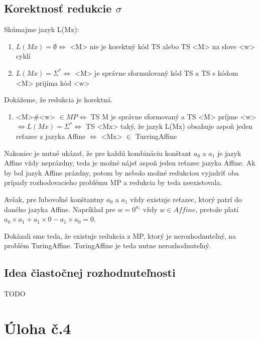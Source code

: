 \documentclass[10pt]{article}
\begin{document}
\subsection*{Korektnosť redukcie $\sigma$}
Skúmajme jazyk L(Mx):
\begin{enumerate}
    \item $L(Mx) = \emptyset \iff$ <M> nie je korektný kód TS alebo TS <M> na slove <w> cyklí 
    \item $L(Mx) = \Sigma^* \iff$ <M> je správne sformulovaný kód TS a TS s kódom <M> prijíma kód <w>
\end{enumerate}

Dokážeme, že redukcia je korektná.
\begin{enumerate}
    \item <M>\#<w> $\in MP \iff$ TS M je správne sformovaný a TS <M> príjme <w> $\iff L(Mx) =
        \Sigma^* \iff$ TS <Mx> taký, že jazyk L(Mx) obsahuje aspoň jeden reťazec z jazyka Affine
        $\iff$ <Mx> $\in$ TurringAffine
\end{enumerate}

Nakoniec je nutné ukázať, že pre každú kombináciu konštant $a_0$ a $a_1$ je jazyk Affine vždy
neprázdny, teda je možné nájsť aspoň jeden reťazec jazyka Affine. Ak by bol jazyk Affine prázdny,
potom by nebolo možné redukciou vyjadriť oba prípady rozhodovacieho problému MP a redukcia by teda
neexistovala. 

Avšak, pre ľubovoľné konštantny $a_0$ a $a_1$ vždy existuje reťazec, ktorý patrí do daného jazyka Affine.
Napríklad pre $w = 0^{a_1}$ vždy $w
\in Affine$, pretože platí $a_0 \times a_1 + a_1 \times 0 - a_1\times a_0 = 0$.

Dokázali sme teda, že existuje redukcia z MP, ktorý je nerozhodnuteľný, na problém TuringAffine.
TuringAffine je teda nutne nerozhodnuteľný.
\subsection*{Idea čiastočnej rozhodnuteľnosti}
TODO

\section*{Úloha č.4}
\end{document}
